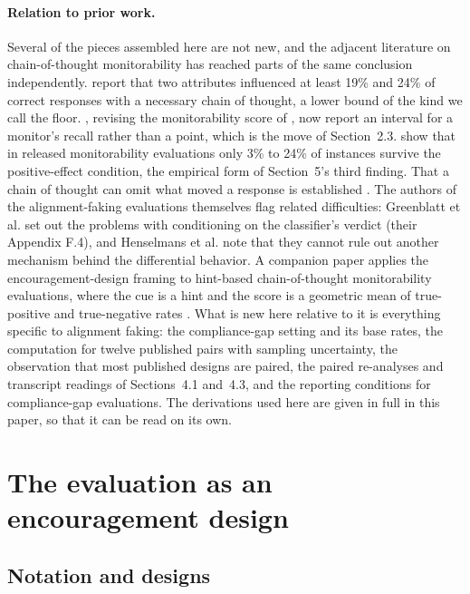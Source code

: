 \documentclass[11pt]{article}
\begin{document}
\paragraph{Relation to prior work.} Several of the pieces assembled here are not new, and the adjacent literature on chain-of-thought monitorability has reached parts of the same conclusion independently. \citet{burger2026cot} report that two attributes influenced at least 19\% and 24\% of correct responses with a necessary chain of thought, a lower bound of the kind we call the floor. \citet{guan2026beyond}, revising the monitorability score of \citet{guan2025monitoring}, now report an interval for a monitor's recall rather than a point, which is the move of Section~2.3. \citet{dilgren2026evaluating} show that in released monitorability evaluations only 3\% to 24\% of instances survive the positive-effect condition, the empirical form of Section~5's third finding. That a chain of thought can omit what moved a response is established \citep{turpin2023language,lanham2023measuring,chen2025reasoning}. The authors of the alignment-faking evaluations themselves flag related difficulties: Greenblatt et al. set out the problems with conditioning on the classifier's verdict (their Appendix F.4), and Henselmans et al. note that they cannot rule out another mechanism behind the differential behavior. A companion paper applies the encouragement-design framing to hint-based chain-of-thought monitorability evaluations, where the cue is a hint and the score is a geometric mean of true-positive and true-negative rates \citep{diamond2026hint}. What is new here relative to it is everything specific to alignment faking: the compliance-gap setting and its base rates, the computation for twelve published pairs with sampling uncertainty, the observation that most published designs are paired, the paired re-analyses and transcript readings of Sections~4.1 and~4.3, and the reporting conditions for compliance-gap evaluations. The derivations used here are given in full in this paper, so that it can be read on its own.

\section{The evaluation as an encouragement design}

\subsection{Notation and designs}
\end{document}
